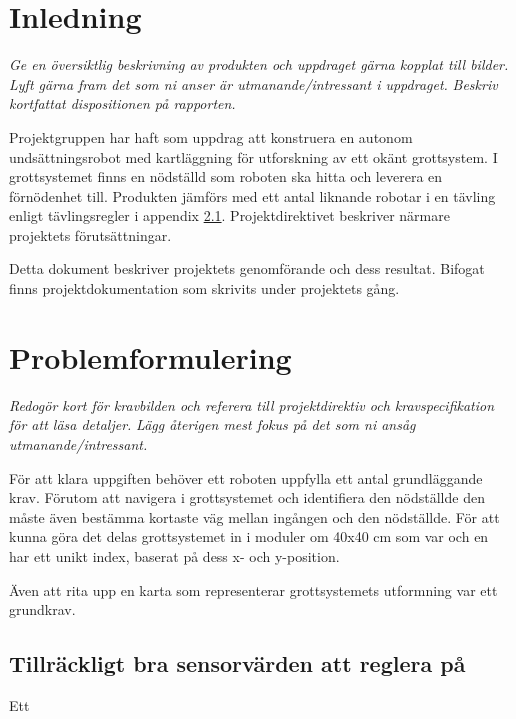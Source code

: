 \documentclass[11pt]{article}
\begin{document}
\begin{flushleft}
\section{Inledning}
\textit{Ge en översiktlig beskrivning av produkten och uppdraget gärna kopplat till bilder.}
\textit{Lyft gärna fram det som ni anser är utmanande/intressant i uppdraget.}
\textit{Beskriv kortfattat dispositionen på rapporten.}

Projektgruppen har haft som uppdrag att konstruera en autonom undsättningsrobot med kartläggning för utforskning av ett okänt grottsystem. I grottsystemet finns en nödställd som roboten ska hitta och leverera en förnödenhet till. Produkten jämförs med ett antal liknande robotar i en tävling enligt tävlingsregler i appendix \ref{}. Projektdirektivet beskriver närmare projektets förutsättningar. 

Detta dokument beskriver projektets genomförande och dess resultat. Bifogat finns projektdokumentation som skrivits under projektets gång.

\pagebreak

\section{Problemformulering}
\textit{Redogör kort för kravbilden och referera till projektdirektiv och kravspecifikation för att läsa detaljer.}
\textit{Lägg återigen mest fokus på det som ni ansåg utmanande/intressant.}

För att klara uppgiften behöver ett roboten uppfylla ett antal grundläggande krav. Förutom att navigera i grottsystemet och identifiera den nödställde den måste även bestämma kortaste väg mellan ingången och den nödställde. För att kunna göra det delas grottsystemet in i moduler om 40x40 cm som var och en har ett unikt index, baserat på dess x- och y-position.

Även att rita upp en karta som representerar grottsystemets utformning var ett grundkrav. 


\subsection{Tillräckligt bra sensorvärden att reglera på}
Ett 





\end{flushleft}
\end{document}

